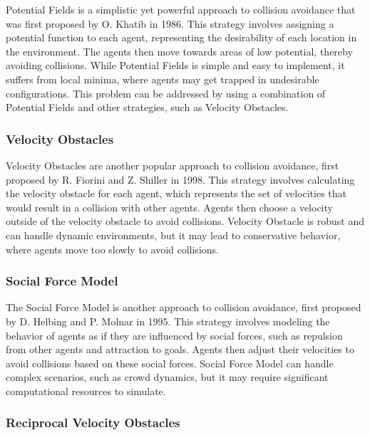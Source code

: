 \documentclass[a4paper,12pt]{article}
\begin{document}
{Potential Fields} is a simplistic yet powerful approach to collision avoidance that was first proposed by O. Khatib\cite{Khatib1986} in 1986. This strategy involves assigning a potential function to each agent, representing the desirability of each location in the environment. The agents then move towards areas of low potential, thereby avoiding collisions. While Potential Fields is simple and easy to implement, it suffers from local minima, where agents may get trapped in undesirable configurations. This problem can be addressed by using a combination of Potential Fields and other strategies, such as Velocity Obstacles.

\subsubsection{Velocity Obstacles}
\label{rel_work_collision_velocity}

{Velocity Obstacles} are another popular approach to collision avoidance, first proposed by R. Fiorini and Z. Shiller\cite{osti_665350} in 1998. This strategy involves calculating the velocity obstacle for each agent, which represents the set of velocities that would result in a collision with other agents. Agents then choose a velocity outside of the velocity obstacle to avoid collisions. Velocity Obstacle is robust and can handle dynamic environments, but it may lead to conservative behavior, where agents move too slowly to avoid collisions.

\subsubsection{Social Force Model}
\label{rel_work_collision_social}

The {Social Force Model} is another approach to collision avoidance, first proposed by D. Helbing and P. Molnar\cite{PhysRevE.51.4282} in 1995. This strategy involves modeling the behavior of agents as if they are influenced by social forces, such as repulsion from other agents and attraction to goals. Agents then adjust their velocities to avoid collisions based on these social forces. Social Force Model can handle complex scenarios, such as crowd dynamics, but it may require significant computational resources to simulate.

\subsubsection{Reciprocal Velocity Obstacles}
\label{rel_work_collision_reciprocal}
\end{document}
